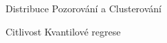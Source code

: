 \documentclass[11pt, a4paper]{article}
\begin{document}
\clearpage

\begin{figure}[ht]
\centering
\noindent{}
\caption{Distribuce Pozorování a Clusterování}
\label{Distribuce Pozorování a Clusterování}
\end{figure}

\clearpage

\begin{figure}[ht]
\centering
\noindent{}
\caption{Citlivost Kvantilové regrese}
\label{Citlivost kvantilové regrese}
\end{figure}

  \clearpage
%

\newpage

\end{document}
